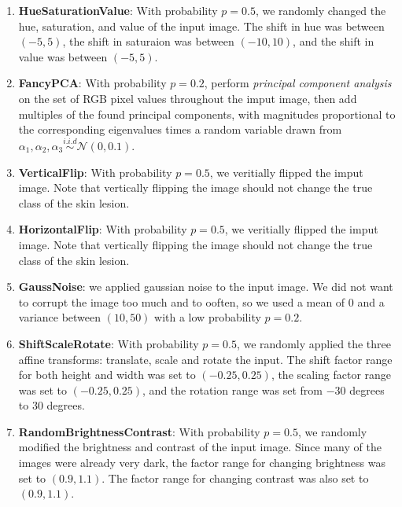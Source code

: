 \documentclass [MAS] {uclathes}
\begin{document}
\begin{enumerate}
    \item \textbf{HueSaturationValue}: With probability $p=0.5$, we randomly changed the hue, saturation, and value of the input image. The shift in hue was between $(-5, 5)$, the shift in saturaion was between $(-10, 10)$, and the shift in value was between $(-5, 5)$.
    \item \textbf{FancyPCA}: With probability $p=0.2$, perform \textit{principal component analysis} on the set of RGB pixel values throughout the imput image, then add multiples of the found principal components, with magnitudes proportional to the corresponding eigenvalues times a random variable drawn from $\alpha_1, \alpha_2, \alpha_3 \stackrel{i.i.d}{\sim} \mathcal{N}(0, 0.1)$.
    \item \textbf{VerticalFlip}: With probability $p=0.5$, we veritially flipped the imput image. Note that vertically flipping the image should not change the true class of the skin lesion.
    \item \textbf{HorizontalFlip}: With probability $p=0.5$, we veritially flipped the imput image. Note that vertically flipping the image should not change the true class of the skin lesion.
    \item \textbf{GaussNoise}: we applied gaussian noise to the input image. We did not want to corrupt the image too much and to ooften, so we used a mean of $0$ and a variance between $(10, 50)$ with a low probability $p=0.2$.
    \item \textbf{ShiftScaleRotate}: With probability $p=0.5$, we randomly applied the three affine transforms: translate, scale and rotate the input. The shift factor range for both height and width was set to $(-0.25, 0.25)$, the scaling factor range was set to $(-0.25, 0.25)$, and the rotation range was set from $-30$ degrees to $30$ degrees. 
    \item \textbf{RandomBrightnessContrast}: With probability $p=0.5$, we randomly modified the brightness and contrast of the input image. Since many of the images were already very dark, the factor range for changing brightness was set to $(0.9, 1.1)$. The factor range for changing contrast was also set to $(0.9, 1.1)$.
\end{enumerate}
\end{document}
